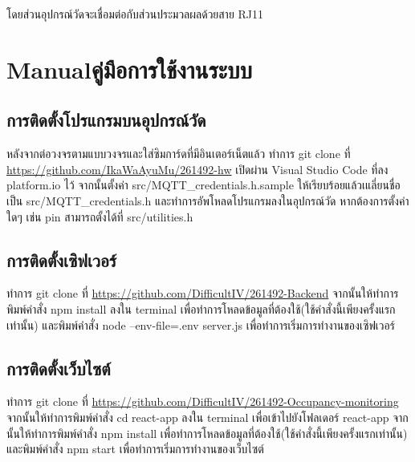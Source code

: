 โดยส่วนอุปกรณ์วัดจะเชื่อมต่อกับส่วนประมวลผลด้วยสาย RJ11

\chapter{\ifenglish Manual\else คู่มือการใช้งานระบบ\fi}

\section{การติดตั้งโปรแกรมบนอุปกรณ์วัด}
    หลังจากต่อวงจรตามแบบวงจรและใส่ซิมการ์ดที่มีอินเตอร์เน็ตแล้ว ทำการ git clone ที่ \url{https://github.com/IkaWaAyuMu/261492-hw} เปิดผ่าน Visual Studio Code ที่ลง platform.io ไว้ จากนั้นตั้งค่า src/MQTT\_credentials.h.sample ให้เรียบร้อยแล้วเแลี่ยนชื่อเป็น src/MQTT\_credentials.h และทำการอัพโหลดโปรแกรมลงในอุปกรณ์วัด หากต้องการตั้งค่าใดๆ เช่น pin สามารถตั้งได้ที่ src/utilities.h

\section{การติดตั้งเซิฟเวอร์}
    ทำการ git clone ที่ \url{https://github.com/DifficultIV/261492-Backend} จากนั้นให้ทำการพิมพ์คำสั่ง npm install ลงใน terminal เพื่อทำการโหลดข้อมูลที่ต้องใช้(ใช้คำสั่งนี้เพียงครั้งแรกเท่านั้น) และพิมพ์คำสั่ง node --env-file=.env server.js เพื่อทำการเริ่มการทำงานของเซิฟเวอร์

\section{การติดตั้งเว็บไซต์}    
    ทำการ git clone ที่ \url{https://github.com/DifficultIV/261492-Occupancy-monitoring} จากนั้นให้ทำการพิมพ์คำสั่ง cd react-app ลงใน terminal เพื่อเข้าไปยังโฟลเดอร์ react-app จากนั้นให้ทำการพิมพ์คำสั่ง npm install เพื่อทำการโหลดข้อมูลที่ต้องใช้(ใช้คำสั่งนี้เพียงครั้งแรกเท่านั้น) และพิมพ์คำสั่ง npm start เพื่อทำการเริ่มการทำงานของเว็บไซต์